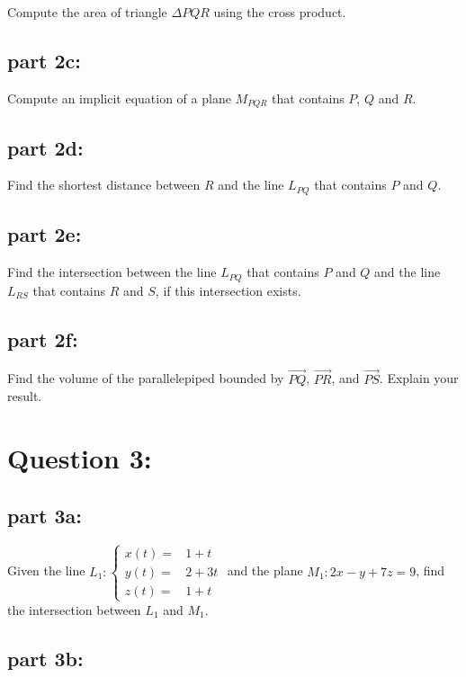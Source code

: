 \documentclass{article}
\newcommand{\pvec}[1]{\overrightarrow{#1}}
\begin{document}
Compute the area of triangle \(\Delta PQR\) using the cross product. 

\subsection*{part 2c:}

Compute an implicit equation of a plane \(M_{PQR}\) that contains \(P\), \(Q\) and \(R\).

\subsection*{part 2d:}

Find the shortest distance between \(R\) and the line \(L_{PQ}\) that contains \(P\) and \(Q\).

\subsection*{part 2e:}

Find the intersection between the line \(L_{PQ}\) that contains \(P\) and \(Q\) and the line \(L_{RS}\) that contains \(R\) and \(S\), if this intersection exists.

\subsection*{part 2f:}

Find the volume of the parallelepiped bounded by \(\pvec{PQ}\), \(\pvec{PR}\), and \(\pvec{PS}\). Explain your result.



\section*{Question 3:}

\subsection*{part 3a:}

Given the line \(L_1: \left\{\begin{array}{rl} x(t) = & 1 + t \\ y(t) = & 2 + 3t \\ z(t) = & 1 + t \end{array}\right.\) and the plane \(M_1: 2x - y + 7z = 9\), find the intersection between \(L_1\) and \(M_1\).

\subsection*{part 3b:}
\end{document}
